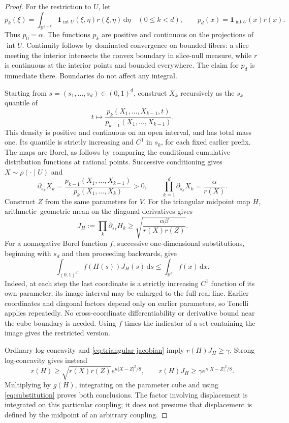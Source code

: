 \documentclass[11pt]{article}
\numberwithin{equation}{section}
\theoremstyle{remark}
\newcommand{\R}{\mathbb R}
\newcommand{\ind}{\mathbf 1}
\newcommand{\dd}{\,\mathrm d}
\newcommand{\interior}{\operatorname{int}}
\begin{document}
\begin{proof}
For the restriction to $U$, let
\[
 p_k(\xi)=\int_{\R^{d-k}}\ind_{\interior U}(\xi,\eta)r(\xi,\eta)\dd\eta
 \quad(0\le k<d),\qquad
 p_d(x)=\ind_{\interior U}(x)r(x).
\]
Thus $p_0=\alpha$. The functions $p_k$ are positive and continuous on the projections of $\interior U$. Continuity follows by dominated convergence on bounded fibers: a slice meeting the interior intersects the convex boundary in slice-null measure, while $r$ is continuous at the interior points and bounded everywhere. The claim for $p_d$ is immediate there. Boundaries do not affect any integral.

Starting from $s=(s_1,\ldots,s_d)\in(0,1)^d$, construct $X_k$ recursively as the $s_k$ quantile of
\[
 t\longmapsto
 \frac{p_k(X_1,\ldots,X_{k-1},t)}{p_{k-1}(X_1,\ldots,X_{k-1})}.
\]
This density is positive and continuous on an open interval, and has total mass one. Its quantile is strictly increasing and $C^1$ in $s_k$, for each fixed earlier prefix. The maps are Borel, as follows by comparing the conditional cumulative distribution functions at rational points. Successive conditioning gives $X\sim\rho(\cdot\mid U)$ and
\[
 \partial_{s_k}X_k=
 \frac{p_{k-1}(X_1,\ldots,X_{k-1})}{p_k(X_1,\ldots,X_k)}>0,
 \qquad
 \prod_{k=1}^d\partial_{s_k}X_k=\frac{\alpha}{r(X)}.
\]
Construct $Z$ from the same parameters for $V$. For the triangular midpoint map $H$, arithmetic--geometric mean on the diagonal derivatives gives
\begin{equation}\label{eq:triangular-jacobian}
 J_H:=\prod_k\partial_{s_k}H_k
 \ge\sqrt{\frac{\alpha\beta}{r(X)r(Z)}}.
\end{equation}
For a nonnegative Borel function $f$, successive one-dimensional substitutions, beginning with $s_d$ and then proceeding backwards, give
\begin{equation}\label{eq:substitution}
 \int_{(0,1)^d}f(H(s))J_H(s)\dd s\le\int_{\R^d}f(x)\dd x.
\end{equation}
Indeed, at each step the last coordinate is a strictly increasing $C^1$ function of its own parameter; its image interval may be enlarged to the full real line. Earlier coordinates and diagonal factors depend only on earlier parameters, so Tonelli applies repeatedly. No cross-coordinate differentiability or derivative bound near the cube boundary is needed. Using $f$ times the indicator of a set containing the image gives the restricted version.

Ordinary log-concavity and \eqref{eq:triangular-jacobian} imply $r(H)J_H\ge\gamma$. Strong log-concavity gives instead
\[
 r(H)\ge\sqrt{r(X)r(Z)}e^{\kappa|X-Z|^2/8},
 \qquad r(H)J_H\ge\gamma e^{\kappa|X-Z|^2/8}.
\]
Multiplying by $g(H)$, integrating on the parameter cube and using \eqref{eq:substitution} proves both conclusions. The factor involving displacement is integrated on this particular coupling; it does not presume that displacement is defined by the midpoint of an arbitrary coupling.
\end{proof}
\end{document}
